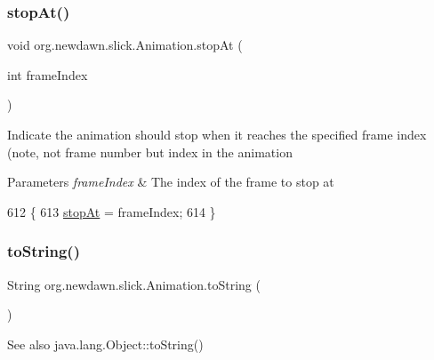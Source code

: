 \subsubsection{\texorpdfstring{stop\+At()}{stopAt()}}
{\footnotesize\ttfamily void org.\+newdawn.\+slick.\+Animation.\+stop\+At (\begin{DoxyParamCaption}\item[{int}]{frame\+Index }\end{DoxyParamCaption})\hspace{0.3cm}{\ttfamily [inline]}}

Indicate the animation should stop when it reaches the specified frame index (note, not frame number but index in the animation


\begin{DoxyParams}{Parameters}
{\em frame\+Index} & The index of the frame to stop at \\
\hline
\end{DoxyParams}

\begin{DoxyCode}
612                                        \{
613         \mbox{\hyperlink{classorg_1_1newdawn_1_1slick_1_1_animation_a4b2bd97ccab1897bcca89f4d873b5db1}{stopAt}} = frameIndex; 
614     \}
\end{DoxyCode}
\mbox{\label{classorg_1_1newdawn_1_1slick_1_1_animation_a6a471c56f65c091dac6b21772d640872}} 
\subsubsection{\texorpdfstring{to\+String()}{toString()}}
{\footnotesize\ttfamily String org.\+newdawn.\+slick.\+Animation.\+to\+String (\begin{DoxyParamCaption}{ }\end{DoxyParamCaption})\hspace{0.3cm}{\ttfamily [inline]}}

\begin{DoxySeeAlso}{See also}
java.\+lang.\+Object\+::to\+String() 
\end{DoxySeeAlso}

